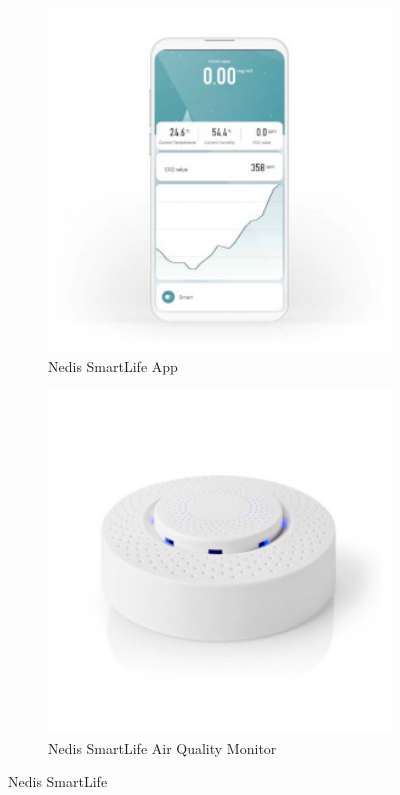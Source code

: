 \begin{figure} [!ht]
    \centering
    \begin{subfigure}{0.35\textwidth}
         \centering
         \includegraphics[width=1.2\textwidth]{figures/NedisApp.jpg}
         \caption{Nedis SmartLife App \cite{Nedis}}
         \label{fig:NedisApp}
     \end{subfigure}
     \hspace{2cm}
      \begin{subfigure}{0.35\textwidth}
         \centering
         \includegraphics[width=1.2\textwidth]{figures/NedisDevice.jpg}
         \caption{Nedis SmartLife Air Quality Monitor \cite{Nedis}}
         \label{fig:NedisDev}
     \end{subfigure}
     \caption{Nedis SmartLife}
     \label{fig:NedisBoth}
\end{figure}

